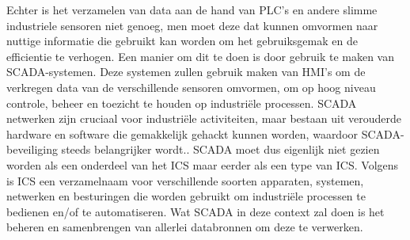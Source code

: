 Echter is het verzamelen van data aan de hand van PLC’s en andere slimme industriele sensoren niet genoeg, men moet deze dat kunnen omvormen naar nuttige informatie die gebruikt kan worden om het gebruiksgemak en de efficientie te verhogen. Een manier om dit te doen is door gebruik te maken van SCADA-systemen. 
Deze systemen zullen gebruik maken van HMI’s om de verkregen data van de verschillende sensoren omvormen, om op hoog niveau controle, beheer en toezicht te houden op industriële processen. SCADA netwerken zijn cruciaal voor industriële activiteiten, maar bestaan uit verouderde hardware en software die gemakkelijk gehackt kunnen worden, waardoor SCADA-beveiliging steeds belangrijker wordt.\autocite{FortinetSC2025}. SCADA moet dus eigenlijk niet gezien worden als een onderdeel van het ICS maar eerder als een type van ICS. 
Volgens \textcite{Mhaskar2021} is ICS een verzamelnaam voor verschillende soorten apparaten, systemen, netwerken en besturingen die worden gebruikt om industriële processen te bedienen en/of te automatiseren. Wat SCADA in deze context zal doen is het beheren en samenbrengen van allerlei databronnen om deze te verwerken.


